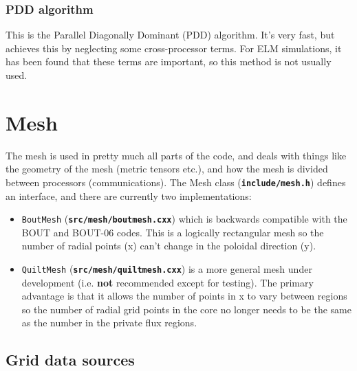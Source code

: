 \documentclass[12pt]{article}
\newcommand{\file}[1]{\texttt{\bf #1}}
\begin{document}
\subsubsection{PDD algorithm}

This is the Parallel Diagonally Dominant (PDD) algorithm. It's very fast, but
achieves this by neglecting some cross-processor terms. For ELM simulations, 
it has been found that these terms are important, so this method is not
usually used. 

\section{Mesh}
The mesh is used in pretty much all parts of the code, and deals with 
things like the geometry of the mesh (metric tensors etc.), and how the
mesh is divided between processors (communications). The Mesh class
(\file{include/mesh.h}) defines an interface, and there are currently
two implementations:
\begin{itemize}
\item \lstinline!BoutMesh! (\file{src/mesh/boutmesh.cxx})  which is backwards compatible
  with the BOUT and BOUT-06 codes. This is a logically rectangular mesh so
  the number of radial points (x) can't change in the poloidal direction (y). 
  
\item \lstinline!QuiltMesh! (\file{src/mesh/quiltmesh.cxx})  is a more general mesh under development
  (i.e. {\bf not} recommended except for testing). The primary advantage is that
  it allows the number of points in x to vary between regions so the number of radial
  grid points in the core no longer needs to be the same as the number in the private
  flux regions.
\end{itemize}

\subsection{Grid data sources}
\end{document}
